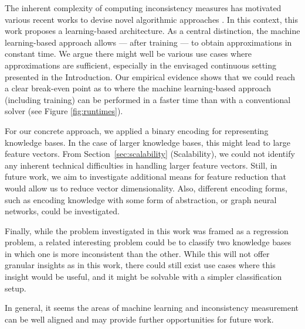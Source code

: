 The inherent complexity of computing inconsistency measures has motivated various recent works to devise novel algorithmic approaches \cite{kuhlmann2021algorithms,kuhlmann2023computing}. In this context, this work proposes a learning-based architecture. As a central distinction, the machine learning-based approach allows --- after training --- to obtain approximations in constant time. We argue there might well be various use cases where approximations are sufficient, especially in the envisaged continuous setting presented in the Introduction. Our empirical evidence shows that we could reach a clear break-even point as to where the machine learning-based approach (including training) can be performed in a faster time than with a conventional solver (see Figure \ref{fig:runtimes}).%

For our concrete approach, we applied a binary encoding for representing knowledge bases. In the case of larger knowledge bases, this might lead to large feature vectors. From Section~\ref{sec:scalability} (Scalability), we could not identify any inherent technical difficulties in handling larger feature vectors. Still, in future work, we aim to investigate additional means for feature reduction that would allow us to reduce vector dimensionality. Also, different encoding forms, such as encoding knowledge with some form of abstraction, or graph neural networks, could be investigated.


Finally, while the problem investigated in this work was framed as a regression problem, a related interesting problem could be to classify two knowledge bases in which one is more inconsistent than the other. While this will not offer granular insights as in this work, there could still exist use cases where this insight would be useful, and it might be solvable with a simpler classification setup. 

In general, it seems the areas of machine learning and inconsistency measurement can be well aligned and may provide further opportunities for future work.